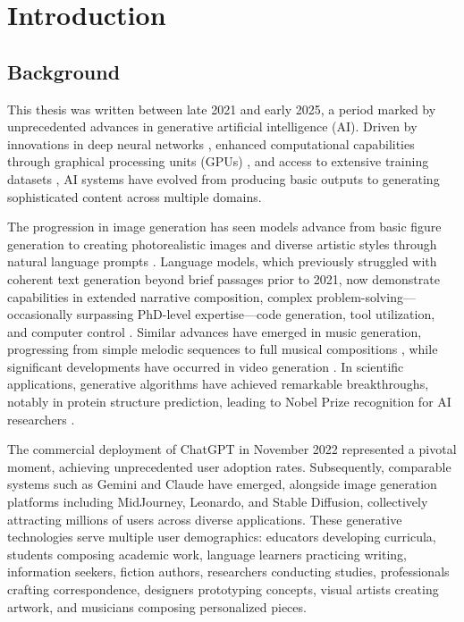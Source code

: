 \chapter{Introduction}


\section{Background}

This thesis was written between late 2021 and early 2025, a period marked by unprecedented advances in generative artificial intelligence (AI). Driven by innovations in deep neural networks \cite{Goodfellow-et-al-2014}, enhanced computational capabilities through graphical processing units (GPUs) \cite{Dean-et-al-2012}, and access to extensive training datasets \cite{Deng-et-al-2009}, AI systems have evolved from producing basic outputs to generating sophisticated content across multiple domains.

The progression in image generation has seen models advance from basic figure generation to creating photorealistic images and diverse artistic styles through natural language prompts \cite{Ramesh-et-al-2022}. Language models, which previously struggled with coherent text generation beyond brief passages prior to 2021, now demonstrate capabilities in extended narrative composition, complex problem-solving—occasionally surpassing PhD-level expertise—code generation, tool utilization, and computer control \cite{Brown-et-al-2020}. Similar advances have emerged in music generation, progressing from simple melodic sequences to full musical compositions \cite{Huang-et-al-2020}, while significant developments have occurred in video generation \cite{Sohn-et-al-2015}. In scientific applications, generative algorithms have achieved remarkable breakthroughs, notably in protein structure prediction, leading to Nobel Prize recognition for AI researchers \cite{NobelPrize2024}.

The commercial deployment of ChatGPT in November 2022 represented a pivotal moment, achieving unprecedented user adoption rates. Subsequently, comparable systems such as Gemini and Claude have emerged, alongside image generation platforms including MidJourney, Leonardo, and Stable Diffusion, collectively attracting millions of users across diverse applications. These generative technologies serve multiple user demographics: educators developing curricula, students composing academic work, language learners practicing writing, information seekers, fiction authors, researchers conducting studies, professionals crafting correspondence, designers prototyping concepts, visual artists creating artwork, and musicians composing personalized pieces.

